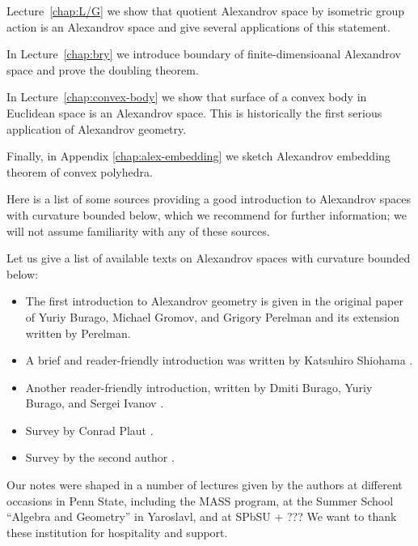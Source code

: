Lecture~\ref{chap:L/G} we show that quotient Alexandrov space by isometric group action is an Alexandrov space and give several applications of this statement.

In Lecture~\ref{chap:bry} we introduce boundary of finite-dimensioanal Alexandrov space and prove the doubling theorem.

In Lecture~\ref{chap:convex-body} we show that surface of a convex body in Euclidean space is an Alexandrov space. This is historically the first serious application of Alexandrov geometry.

Finally, in Appendix \ref{chap:alex-embedding}
 we sketch Alexandrov embedding theorem of convex polyhedra.

\medskip

Here is a list of some sources providing a good introduction to Alexandrov spaces with curvature bounded below, which we recommend for further information;
we will not assume familiarity with any of these sources.

Let us give a list of available texts on Alexandrov spaces with curvature bounded below: 
\begin{itemize}
\item The first introduction to Alexandrov geometry is given in the original paper of Yuriy Burago, Michael Gromov, and Grigory Perelman \cite{burago-gromov-perelman} 
and its extension \cite{perelman1991} written by Perelman.
\item A brief and reader-friendly introduction was written by Katsuhiro Shiohama \cite[Sections 1--8]{shiohama}.
\item Another reader-friendly introduction, written by Dmiti Burago, Yuriy
Burago, and Sergei Ivanov \cite[Chapter 10]{burago-burago-ivanov}.
\item Survey by Conrad Plaut \cite{plaut:survey}.
\item Survey by the second author \cite{petrunin:survey}.
\end{itemize}

Our notes were shaped in a number of lectures given by the authors
at different occasions in Penn State, including the MASS program,
at the Summer School ``Algebra and Geometry'' in Yaroslavl,
and at SPbSU + ???
We want to thank these institution for hospitality and support.


